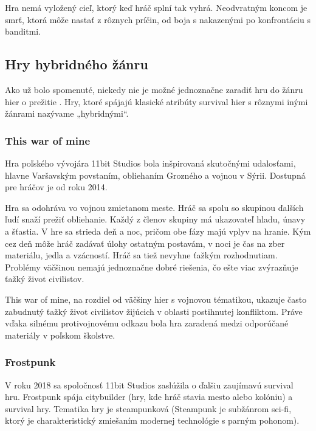 \documentclass[10pt,oneoside,slovak,a4paper]{article}
\begin{document}
Hra nemá vyložený cieľ, ktorý keď hráč splní tak vyhrá. Neodvratným koncom je smrť, ktorá môže nastať z rôznych príčin, od boja s nakazenými po konfrontáciu s banditmi.\cite{Mosel}







\subsection{Hry hybridného žánru}

Ako už bolo spomenuté, niekedy nie je možné  jednoznačne zaradiť hru do žánru hier o prežitie . Hry, ktoré spájajú klasické atribúty survival hier s rôznymi inými žánrami nazývame „hybridnými“. 

\subsubsection{This war of mine}

Hra poľského vývojára 11bit Studios bola inšpirovaná skutočnými udalosťami, hlavne Varšavským povstaním, obliehaním Grozného a vojnou v Sýrii. Dostupná pre hráčov je od roku 2014.\cite{PL}

Hra sa odohráva vo  vojnou zmietanom meste. Hráč sa spolu so skupinou ďalších ľudí snaží prežiť obliehanie. Každý z členov skupiny má ukazovateľ hladu, únavy a šťastia. V hre sa strieda deň a noc, pričom obe fázy majú vplyv na hranie. Kým cez deň môže hráč zadávať úlohy ostatným  postavám, v noci je čas na zber materiálu, jedla a vzácností.
Hráč sa tiež nevyhne ťažkým rozhodnutiam. Problémy väčšinou nemajú jednoznačne dobré riešenia, čo ešte viac zvýrazňuje ťažký život civilistov.\cite{Pergerson}

This war of mine, na rozdiel od väčšiny hier s vojnovou tématikou, ukazuje často zabudnutý ťažký život civilistov žijúcich v oblasti postihnutej konfliktom. Práve vďaka silnému protivojnovému odkazu bola hra zaradená  medzi odporúčané materiály v poľskom školstve. \cite{PL}

\subsubsection{Frostpunk}

V roku 2018 sa spoločnosť 11bit Studios zaslúžila o ďalšiu zaujímavú survival hru. Frostpunk spája citybuilder (hry, kde hráč stavia mesto alebo kolóniu) a survival hry. Tematika hry je steampunková (Steampunk je subžánrom sci-fi, ktorý je charakteristický zmiešaním modernej technológie s parným pohonom).\cite{Salo}
\end{document}
